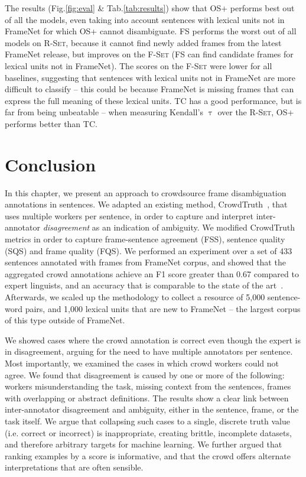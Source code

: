 The results (Fig.\ref{fig:eval} \& Tab.\ref{tab:results}) show that OS+ performs best out of all the models, even taking into account sentences with lexical units not in FrameNet for which OS+ cannot disambiguate. FS performs the worst out of all models on \textsc{R-Set}, because it cannot find newly added frames from the latest FrameNet release, but improves on the \textsc{F-Set} (FS can find candidate frames for lexical units not in FrameNet). The scores on the \textsc{F-Set} were lower for all baselines, suggesting that sentences with lexical units not in FrameNet are more difficult to classify -- this could be because FrameNet is missing frames that can express the full meaning of these lexical units. TC has a good performance, but is far from being unbeatable -- when measuring Kendall's $\uptau$ over the \textsc{R-Set}, OS+ performs better than TC.



\section{Conclusion}

In this chapter, we present an approach to crowdsource frame disambiguation annotations in sentences. We adapted an existing method, CrowdTruth~\cite{aroyo2014threesides}, that uses multiple workers per sentence, in order to capture and interpret inter-annotator \emph{disagreement} as an indication of ambiguity. We modified CrowdTruth metrics in order to capture frame-sentence agreement (FSS), sentence quality (SQS) and frame quality (FQS). We performed an experiment over a set of 433 sentences annotated with frames from FrameNet corpus, and showed that the aggregated crowd annotations achieve an F1 score greater than 0.67 compared to expert linguists, and an accuracy that is comparable to the state of the art~\cite{Hong:2011:GCR:2018966.2018970}. Afterwards, we scaled up the methodology to collect a resource of 5,000 sentence-word pairs, and 1,000 lexical units that are new to FrameNet -- the largest corpus of this type outside of FrameNet.

We showed cases where the crowd annotation is correct even though the expert is in disagreement, arguing for the need to have multiple annotators per sentence. Most importantly, we examined the cases in which crowd workers could not agree. We found that disagreement is caused by one or more of the following: workers misunderstanding the task, missing context from the sentences, frames with overlapping or abstract definitions. The results show a clear link between inter-annotator disagreement and ambiguity, either in the sentence, frame, or the task itself. We argue that collapsing such cases to a single, discrete truth value (i.e. correct or incorrect) is inappropriate, creating brittle, incomplete datasets, and therefore arbitrary targets for machine learning.  We further argued that ranking examples by a score is informative, and that the crowd offers alternate interpretations that are often sensible.

